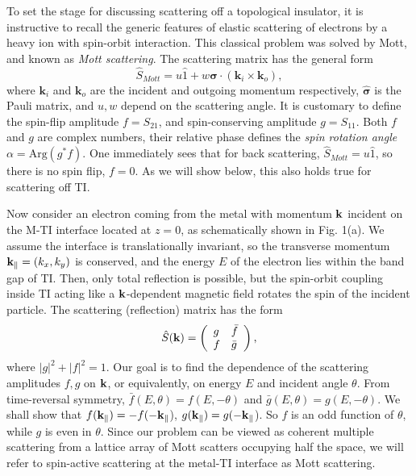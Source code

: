 To set the stage for discussing scattering off a topological insulator, it is instructive to recall the generic features of elastic scattering of electrons by a heavy ion with spin-orbit interaction. This classical problem was solved by Mott, and known as {\it Mott scattering}. 
The scattering matrix has the general form \cite{mott}
\[
\hat{S}_{Mott}=u\hat{1}+w\hat{{\boldsymbol{\sigma}}}\cdot (\mathbf{k}_{i}\times \mathbf{k}_{o}),
\]
where $\mathbf{k}_{i}$ and $\mathbf{k}_{o}$ are the incident and outgoing momentum respectively, $\hat{\boldsymbol{\sigma}}$ is the Pauli matrix, and $u,w$ depend on the scattering angle. It is customary to
define the spin-flip amplitude $f=S_{21}$, and spin-conserving amplitude $g=S_{11}$. 
Both $f$ and $g$ are complex numbers, their relative phase defines the {\it spin rotation angle} $\alpha=\mathrm{Arg}(g^*f)$.
One immediately sees that for back scattering, $\hat{S}_{Mott}=u\hat{1}$, so there is no spin flip, $f=0$. As we will show below, this also holds true for scattering off TI.

Now consider an electron coming from the metal 
with momentum $\mathbf{k}$ incident on the M-TI interface located at $z=0$, 
as schematically shown in Fig. 1(a). 
We assume the interface is 
translationally invariant, so the transverse momentum $\mathbf{k}_{\parallel}=(k_x,k_y)$ is 
conserved, and the energy $E$ of the electron 
lies within the band gap of TI. Then, only total reflection 
is possible, but the spin-orbit coupling inside TI acting like a $\mathbf{k}$-dependent magnetic field rotates the spin of the incident particle. The scattering (reflection) matrix has the form
\[
\hat{S}(\mathbf{k})=\left(
\begin{array}{ll}
  g & \bar{f}   \\
  f & \bar{g}
  \end{array}
\right),
\]
where $|g|^2+|f|^2=1$. 
Our goal is to find the dependence of the scattering amplitudes $f,g$ 
on $\mathbf{k}$, or equivalently, on energy $E$ and 
incident angle $\theta$. From time-reversal symmetry, 
$\bar{f}(E,\theta)=f(E,-\theta)$ and $\bar{g}(E,\theta)=g(E,-\theta)$.
We shall show that
$f(\mathbf{k}_{\parallel})=-f(-\mathbf{k}_{\parallel}$),
$g(\mathbf{k}_{\parallel})=g(-\mathbf{k}_{\parallel}$). So 
$f$ is an odd function of $\theta$, while $g$ is even in $\theta$.  
Since our problem can be viewed as coherent multiple scattering from a lattice 
array of Mott scatters occupying half the space, we will refer to
spin-active scattering at the metal-TI interface as Mott scattering.


